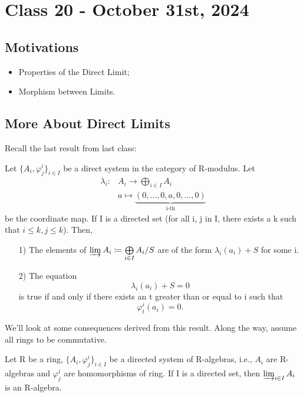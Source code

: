 \documentclass[../category_theory.tex]{subfiles}
\begin{document}
\section{Class 20 - October 31st, 2024}
\subsection{Motivations}
\begin{itemize}
	\item Properties of the Direct Limit;
	\item Morphism between Limits.
\end{itemize}
\subsection{More About Direct Limits}
Recall the last result from last class:
\begin{theorem*}
	Let \(\{A_{i}, \varphi_{j}^{i}\}_{i\in I}\) be a direct system in the category of R-modulus. Let
	\begin{align*}
		\lambda_{i}: & A_{i}\rightarrow \bigoplus_{i\in I}A_{i}                        \\
		             & a\mapsto \underbrace{(0,\dotsc ,0,a,0,\dotsc ,0)}_{\text{i-th}}
	\end{align*}
	be the coordinate map. If I is a directed set (for all i, j in I, there exists a k such that \(i\leq k, j\leq k\)). Then,
	\begin{itemize}
		\item[1)] The elements of \(\varinjlim_{}A_{i}\coloneqq \bigoplus\limits_{i\in I}A_{i}/S\) are of the form \(\lambda_{i}(a_{i})+S\) for some i.
		\item[2)] The equation
		      \[
			      \lambda_{i}(a_{i})+S=0
		      \]
		      is true if and only if there exists an t greater than or equal to i such that
		      \[
			      \varphi_{t}^{i}(a_{i})=0.
		      \]
	\end{itemize}
\end{theorem*}
We'll look at some consequences derived from this result. Along the way, assume all rings to be commutative.
\begin{prop*}
	Let R be a ring, \(\{A_{i}, \varphi_{j}^{i}\}_{i\in I}\) be a directed system of R-algebras, i.e., \(A_{i}\) are R-algebras and \(\varphi_{j}^{i}\) are homomorphisms of ring. If I is a directed set, then \(\varinjlim_{i\in I}A_{i}\) is an R-algebra.
\end{prop*}
\end{document}
